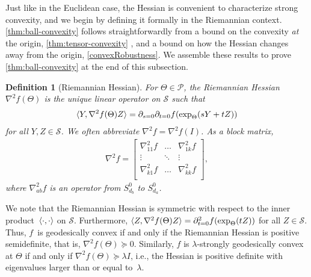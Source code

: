 \documentclass{article}
\newtheorem{definition}{Definition}
\renewcommand{\vec}{\bm}
\newcommand\Sym{\mathcal{S}}
\newcommand\smallSym{S}
\newcommand\SPD{\mathcal{P}}
\newcommand{\CF}[1]{{\color{purple}[CF: #1]}}
\newcommand{\MW}[1]{{\color{red}[MW: #1]}}
\begin{document}

Just like in the Euclidean case, the Hessian is convenient to characterize strong convexity, and we begin by defining it formally in the Riemannian context. \cref{thm:ball-convexity} follows straightforwardly from a bound on the convexity \emph{at} the origin,  \cref{thm:tensor-convexity} , and a bound on how the Hessian changes away from the origin, \cref{convexRobustness}. We assemble these results to prove \cref{thm:ball-convexity} at the end of this subsection. %




\begin{definition}[Riemannian Hessian]
For $\Theta \in \SPD$, the \emph{Riemannian Hessian}~$\nabla^2 f(\Theta)$ is the unique linear operator on $\Sym$ such that
\begin{align*}
  \braket{Y, \nabla^2 f(\Theta) Z} = \partial_{s=0} \partial_{t=0} f(\exp_{\Theta}(sY + tZ))
\end{align*}
for all $Y, Z\in \Sym$.
We often abbreviate $\nabla^2 f = \nabla^2 f(I)$.
As a block matrix,
\begin{align*}
  \nabla^2 f = \begin{bmatrix}
  \nabla_{11}^2 f & \dots & \nabla_{1k}^2 f \\
  \vdots & \ddots & \vdots \\
  \nabla_{k1}^2 f & \dots & \nabla_{kk}^2 f \\
  \end{bmatrix},
\end{align*}
where $\nabla_{ab}^2f$ is an operator from $\smallSym_{d_b}^0$ to $\smallSym_{d_a}^0$.
\end{definition}

We note that the Riemannian Hessian is symmetric with respect to the inner product~$\braket{\cdot,\cdot}$ on $\Sym$.
Furthermore, $\braket{Z, \nabla^2 f(\Theta) Z} = \partial^2_{t=0} f(\exp_{\Theta}(tZ))$ for all $Z\in \Sym$.
Thus, $f$~is geodesically convex if and only if the Riemannian Hessian is positive semidefinite, that is, $\nabla^2 f(\Theta) \succeq 0$.
Similarly, $f$ is $\lambda$-strongly geodesically convex at $\Theta$ if and only if $\nabla^2 f(\Theta) \succeq \lambda I$, i.e., the Hessian is positive definite with eigenvalues larger than or equal to~$\lambda$.
\end{document}
